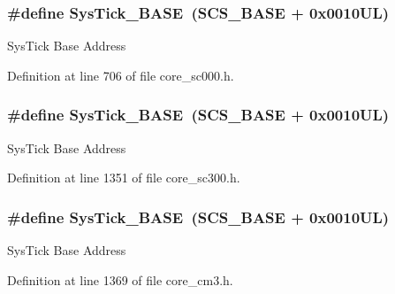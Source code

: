 \subsubsection[{\texorpdfstring{Sys\+Tick\+\_\+\+B\+A\+SE}{SysTick_BASE}}]{\setlength{\rightskip}{0pt plus 5cm}\#define Sys\+Tick\+\_\+\+B\+A\+SE~({\bf S\+C\+S\+\_\+\+B\+A\+SE} +  0x0010\+U\+L)}\hypertarget{group___c_m_s_i_s__core__base_ga58effaac0b93006b756d33209e814646}{}\label{group___c_m_s_i_s__core__base_ga58effaac0b93006b756d33209e814646}
Sys\+Tick Base Address 

Definition at line 706 of file core\+\_\+sc000.\+h.

\subsubsection[{\texorpdfstring{Sys\+Tick\+\_\+\+B\+A\+SE}{SysTick_BASE}}]{\setlength{\rightskip}{0pt plus 5cm}\#define Sys\+Tick\+\_\+\+B\+A\+SE~({\bf S\+C\+S\+\_\+\+B\+A\+SE} +  0x0010\+U\+L)}\hypertarget{group___c_m_s_i_s__core__base_ga58effaac0b93006b756d33209e814646}{}\label{group___c_m_s_i_s__core__base_ga58effaac0b93006b756d33209e814646}
Sys\+Tick Base Address 

Definition at line 1351 of file core\+\_\+sc300.\+h.

\subsubsection[{\texorpdfstring{Sys\+Tick\+\_\+\+B\+A\+SE}{SysTick_BASE}}]{\setlength{\rightskip}{0pt plus 5cm}\#define Sys\+Tick\+\_\+\+B\+A\+SE~({\bf S\+C\+S\+\_\+\+B\+A\+SE} +  0x0010\+U\+L)}\hypertarget{group___c_m_s_i_s__core__base_ga58effaac0b93006b756d33209e814646}{}\label{group___c_m_s_i_s__core__base_ga58effaac0b93006b756d33209e814646}
Sys\+Tick Base Address 

Definition at line 1369 of file core\+\_\+cm3.\+h.


